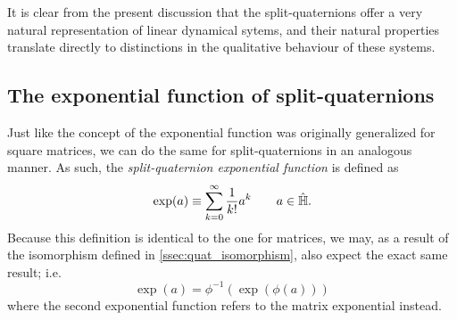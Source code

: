 It is clear from the present discussion that the split-quaternions offer a very natural representation of linear dynamical sytems, and their natural properties translate directly to distinctions in the qualitative behaviour of these systems. 

\subsection{The exponential function of split-quaternions}
Just like the concept of the exponential function was originally generalized for square matrices, we can do the same for split-quaternions in an analogous manner. As such, the \emph{split-quaternion exponential function} is defined as
$$ \exp(a) \equiv \sum_{k=0}^\infty \frac{1}{k!} a^k \qquad a \in \hat{\mathbb{H}}.  $$
Because this definition is identical to the one for matrices, we may, as a result of the isomorphism defined in \cref{ssec:quat_isomorphism}, also expect the exact same result; i.e.
$$ \exp(a) = \phi^{-1}(\exp(\phi(a))) $$
where the second exponential function refers to the matrix exponential instead.

